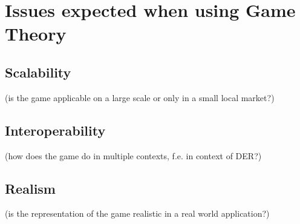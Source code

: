 \section{Issues expected when using Game Theory}

\subsection{Scalability}
(is the game applicable on a large scale or only in a small local market?)
\subsection{Interoperability}
(how does the game do in multiple contexts, f.e. in context of DER?)
\subsection{Realism}
(is the representation of the game realistic in a real world application?)
